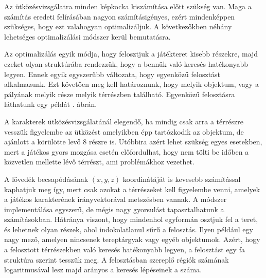 Az ütközésvizsgálatra minden képkocka kiszámítása előtt szükség van. Maga a számítás eredeti felírásában nagyon számításigényes, ezért mindenképpen szükséges, hogy ezt valahogyan optimalizáljuk. A következőkben néhány lehetséges optimalizálási módszer kerül bemutatásra.


Az optimalizálás egyik módja, hogy felosztjuk a játékteret kisebb részekre, majd ezeket olyan struktúrába rendezzük, hogy a bennük való keresés hatékonyabb legyen. Ennek egyik egyszerűbb változata, hogy egyenközű felosztást alkalmazunk. Ezt követően meg kell határoznunk, hogy melyik objektum, vagy a pályának melyik része melyik térrészben található. Egyenközű felosztásra láthatunk egy példát . ábrán.

A karakterek ütközésvizsgálatánál elegendő, ha mindig csak arra a térrészre vesszük figyelembe az ütközést amelyikben épp tartózkodik az objektum, de ajánlott a körülötte levő 8 részre is. Utóbbira azért lehet szükség egyes esetekben, mert a játékos gyors mozgása esetén előfordulhat, hogy nem tölti be időben a közvetlen mellette lévő térrészt, ami problémákhoz vezethet.

A lövedék becsapódásának $(x, y, z)$ koordinátáját is kevesebb számítással kaphatjuk meg így, mert csak azokat a térrészeket kell figyelembe venni, amelyek a játékos karakterének irányvektorával metszésben vannak. A módszer implementálása egyszerű, de mégis nagy gyorsulást tapasztalhatunk a számításokban. Hátránya viszont, hogy mindenhol egyformán osztjuk fel a teret, és lehetnek olyan részek, ahol indokolatlanul sűrű a felosztás. Ilyen például egy nagy mező, amelyen nincsenek tereptárgyak vagy egyéb objektumok. Azért, hogy a felosztott térrészekben való keresés hatékonyabb legyen, a felosztást egy fa struktúra szerint tesszük meg. A felosztásban szereplő régiók számának logaritmusával lesz majd arányos a keresés lépéseinek a száma.

